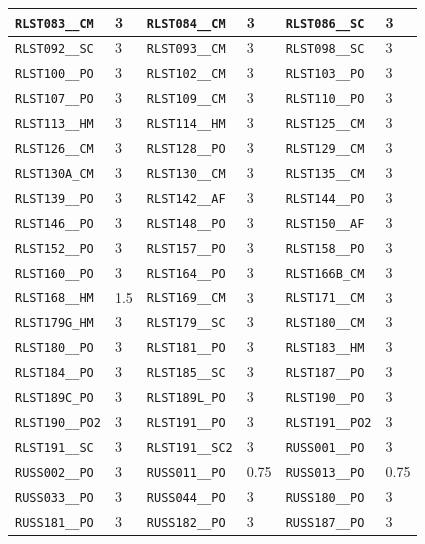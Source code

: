 \begin{longtable}{|l|l||l|l||l|l|}
    \verb|RLST083__CM| & 3 & \verb|RLST084__CM| & 3 & \verb|RLST086__SC| & 3\\\hline
    \verb|RLST092__SC| & 3 & \verb|RLST093__CM| & 3 & \verb|RLST098__SC| & 3\\\hline
    \verb|RLST100__PO| & 3 & \verb|RLST102__CM| & 3 & \verb|RLST103__PO| & 3\\\hline
    \verb|RLST107__PO| & 3 & \verb|RLST109__CM| & 3 & \verb|RLST110__PO| & 3\\\hline
    \verb|RLST113__HM| & 3 & \verb|RLST114__HM| & 3 & \verb|RLST125__CM| & 3\\\hline
    \verb|RLST126__CM| & 3 & \verb|RLST128__PO| & 3 & \verb|RLST129__CM| & 3\\\hline
    \verb|RLST130A_CM| & 3 & \verb|RLST130__CM| & 3 & \verb|RLST135__CM| & 3\\\hline
    \verb|RLST139__PO| & 3 & \verb|RLST142__AF| & 3 & \verb|RLST144__PO| & 3\\\hline
    \verb|RLST146__PO| & 3 & \verb|RLST148__PO| & 3 & \verb|RLST150__AF| & 3\\\hline
    \verb|RLST152__PO| & 3 & \verb|RLST157__PO| & 3 & \verb|RLST158__PO| & 3\\\hline
    \verb|RLST160__PO| & 3 & \verb|RLST164__PO| & 3 & \verb|RLST166B_CM| & 3\\\hline
    \verb|RLST168__HM| & 1.5 & \verb|RLST169__CM| & 3 & \verb|RLST171__CM| & 3\\\hline
    \verb|RLST179G_HM| & 3 & \verb|RLST179__SC| & 3 & \verb|RLST180__CM| & 3\\\hline
    \verb|RLST180__PO| & 3 & \verb|RLST181__PO| & 3 & \verb|RLST183__HM| & 3\\\hline
    \verb|RLST184__PO| & 3 & \verb|RLST185__SC| & 3 & \verb|RLST187__PO| & 3\\\hline
    \verb|RLST189C_PO| & 3 & \verb|RLST189L_PO| & 3 & \verb|RLST190__PO| & 3\\\hline
    \verb|RLST190__PO2| & 3 & \verb|RLST191__PO| & 3 & \verb|RLST191__PO2| & 3\\\hline
    \verb|RLST191__SC| & 3 & \verb|RLST191__SC2| & 3 & \verb|RUSS001__PO| & 3\\\hline
    \verb|RUSS002__PO| & 3 & \verb|RUSS011__PO| & 0.75 & \verb|RUSS013__PO| & 0.75\\\hline
    \verb|RUSS033__PO| & 3 & \verb|RUSS044__PO| & 3 & \verb|RUSS180__PO| & 3\\\hline
    \verb|RUSS181__PO| & 3 & \verb|RUSS182__PO| & 3 & \verb|RUSS187__PO| & 3\\\hline

\end{longtable}
